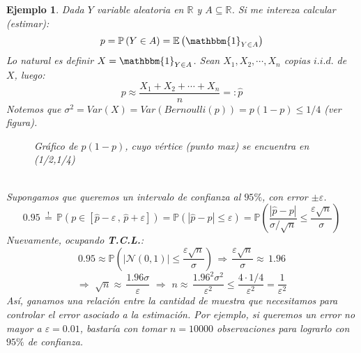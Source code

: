 \documentclass[a4paper]{article}
\newtheorem{ejemplo}{Ejemplo}
\numberwithin{equation}{subsection}
\numberwithin{definicion}{subsection}
\def\R{\mathbb R}
\def\E{\mathbb E}
\newcommand{\pb}{\mathbb{P}}
\begin{document}
\begin{ejemplo}
Dada $Y$ variable aleatoria en $\R$ y $A\subseteq\R$. Si me intereza calcular (estimar):
\[p = \pb\left(Y\in A\right) = \E\left(\mathbbm{1}_{Y\in A}\right)\]
Lo natural es definir $X=\mathbbm{1}_{Y\in A}$. Sean $X_1,X_2,\cdots,X_n$ copias $i.i.d.$ de $X$, luego:
\[p\approx \frac{X_1+X_2+\cdots+X_n}{n}=:\hat{p}\]
Notemos que $\sigma^2 = Var(X) = Var(Bernoulli(p)) = p(1-p) \leq 1/4$ (ver figura).
\newline 
\begin{figure}[h!]
    \centering
    \caption{Gráfico de $p(1-p)$, cuyo vértice (punto max) se encuentra en (1/2,1/4)}
\end{figure}\\
Supongamos que queremos un intervalo de confianza al $95\%$, con error $\pm\varepsilon$.
\[0.95 \,\overset{!}{=}\,\pb\left(p\in[\hat{p}-\varepsilon\,,\,\hat{p}+\varepsilon]\right)= \pb\left(|\hat{p}-p|\leq\varepsilon\right) = \pb\left(\frac{|\hat{p}-p|}{\sigma/\sqrt{n}} \leq \frac{\varepsilon\sqrt{n}}{\sigma}\right)\]
Nuevamente, ocupando \textbf{T.C.L.}:
\[0.95\approx \pb\left(|\mathcal{N}(0,1)|\leq \frac{\varepsilon\sqrt{n}}{\sigma}\right)\,\Rightarrow
\,\frac{\varepsilon\sqrt{n}}{\sigma}\approx\,1.96\]
\[\Rightarrow\,\,\sqrt{n}\approx\,\frac{1.96\sigma}{\varepsilon}\,\,\Rightarrow\,\,n\approx\,\frac{1.96^2\sigma^2}{\varepsilon^2}\leq\frac{4\cdot 1/4}{\varepsilon^2}=\frac{1}{\varepsilon^2}\]
Así, ganamos una relación entre la cantidad de muestra que necesitamos para controlar el error asociado a la estimación. Por ejemplo, si queremos un error no mayor a $\varepsilon = 0.01$, bastaría con tomar $n=10000$ observaciones para lograrlo con $95\%$ de confianza.
\end{ejemplo}
\end{document}
